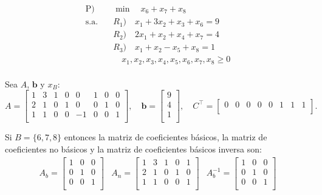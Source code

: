 \documentclass{article}
\begin{document}
\begin{flushleft}
		\begin{center}
			\begin{align*}
				\text{P}) & \quad \min \quad x_6 + x_7 + x_8 \\
				\text{s.a.} & \quad  R_1) \quad x_1 + 3x_2 + x_3 + x_6 = 9 \\
						   & \quad R_2) \quad 2x_1 + x_2 + x_4 + x_7 = 4 \\
						   & \quad R_3) \quad x_1 + x_2 - x_5 + x_8 = 1 \\
						   & \quad \quad x_1, x_2, x_3, x_4, x_5, x_6, x_7, x_8 \geq 0 \\ 
			\end{align*}
		\end{center}
		
		Sea \( A \), \( \mathbf{b} \) y $x_B$:
		\begin{equation*}
			A =
			\left[
			\begin{array}{cccccccc}
			1 & 3 & 1 & 0 & 0 & 1 & 0  & 0  \\
			2 & 1 & 0 & 1 & 0 & 0 & 1 & 0 \\
			1 & 1 & 0 & 0 & -1 & 0 & 0 & 1  \\
			\end{array}
			\right], \quad
			\mathbf{b} =
			\left[
			\begin{array}{c}
			9 \\
			4 \\
			1 \\
			\end{array}
			\right], \quad
			C^\intercal =
			\left[
			\begin{array}{cccccccc}
			0 & 0 & 0 & 0 & 0 & 1 & 1 & 1 \\
			\end{array}
			\right].
		\end{equation*}
		
		Si $B = \{6,7,8\}$ entonces la matriz de coeficientes básicos, la matriz de coeficientes no básicos y la matriz de coeficientes básicos inversa son:
		\begin{equation*}
			\begin{array}{ccc}
				A_b = \begin{bmatrix}
					1 & 0 & 0 \\
					0 & 1 & 0 \\
					0 & 0 & 1 \\
				\end{bmatrix} &
				A_n = \begin{bmatrix}
					1 & 3 & 1 & 0 & 1  \\
					2 & 1 & 0 & 1 & 0 \\
					1 & 1 & 0 & 0 & 1 \\
				\end{bmatrix} &
				A_b^{-1} = \begin{bmatrix}
					1 & 0 & 0 \\
					0 & 1 & 0 \\
					0 & 0 & 1 \\
				\end{bmatrix}
			\end{array}
		\end{equation*}
		

\end{flushleft}
\end{document}
